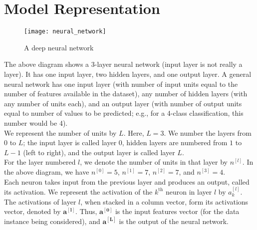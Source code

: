 \documentclass[a4paper, 12pt]{report}
\begin{document}
\section{Model Representation}
\begin{figure}[H]
\centering
\texttt{[image: neural\_network]}
\caption{A deep neural network}
\end{figure}
The above diagram shows a 3-layer neural network (input layer is not really a layer). It has one input layer, two hidden layers, and one output layer. A general neural network has one input layer (with number of input units equal to the number of features available in the dataset), any number of hidden layers (with any number of units each), and an output layer (with number of output units equal to number of values to be predicted; e.g., for a 4-class classification, this number would be 4). \\
\break
We represent the number of units by $L$. Here, $L = 3$. We number the layers from $0$ to $L$; the input layer is called layer $0$, hidden layers are numbered from $1$ to $L-1$ (left to right), and the output layer is called layer $L$. \\
\break
For the layer numbered $l$, we denote the number of units in that layer by $n^{\left[l\right]}$. In the above diagram, we have $n^{\left[0\right]} = 5$, $n^{\left[1\right]} = 7$, $n^{\left[2\right]} = 7$, and $n^{\left[3\right]} = 4$. \\
\break
Each neuron takes input from the previous layer and produces an output, called its activation. We represent the activation of the $k^{\text{th}}$ neuron in layer $l$ by $a_{k}^{\left[l\right]}$. The activations of layer $l$, when stacked in a column vector, form its activations vector, denoted by $\bm{a^{\left[l\right]}}$. Thus, $\bm{a^{\left[0\right]}}$ is the input features vector (for the data instance being considered), and $\bm{a^{\left[L\right]}}$ is the output of the neural network.
\end{document}
